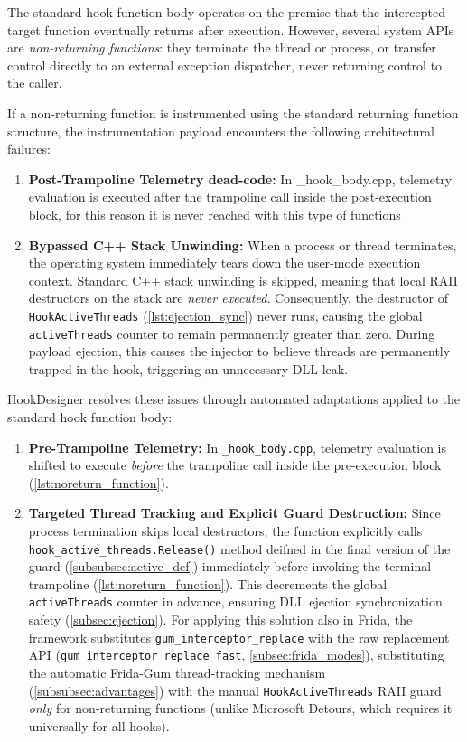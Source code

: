 The standard hook function body operates on the premise that the intercepted target function eventually returns after execution.
However, several system APIs are \emph{non-returning functions}:
they terminate the thread or process, or transfer control directly to an external exception dispatcher, never returning control to the caller.

If a non-returning function is instrumented using the standard returning function structure, the instrumentation payload encounters the following architectural failures:
\begin{enumerate}
	\item \textbf{Post-Trampoline Telemetry dead-code:} In \_hook\_body.cpp, telemetry evaluation is executed after the trampoline call inside the post-execution block, for this reason it is never reached with this type of functions
	\item \textbf{Bypassed C++ Stack Unwinding:} When a process or thread terminates, the operating system immediately tears down the user-mode execution context.
	Standard C++ stack unwinding is skipped, meaning that local RAII destructors on the stack are \emph{never executed}.
	Consequently, the destructor of \texttt{HookActiveThreads} (\cref{lst:ejection_sync}) never runs, causing the global \texttt{activeThreads} counter to remain permanently greater than zero.
	During payload ejection, this causes the injector to believe threads are permanently trapped in the hook, triggering an unnecessary DLL leak.
	
\end{enumerate}

HookDesigner resolves these issues through automated adaptations applied to the standard hook function body:

\begin{enumerate}
	\item \textbf{Pre-Trampoline Telemetry:} In \texttt{\_hook\_body.cpp}, telemetry evaluation is shifted to execute \emph{before} the trampoline call inside the pre-execution block (\cref{lst:noreturn_function}).
	\item \textbf{Targeted Thread Tracking and Explicit Guard Destruction:}  Since process termination skips local destructors, the function explicitly calls \texttt{hook\_active\_threads}\allowbreak\texttt{.Release()} method deifned in the final version of the guard (\cref{subsubsec:active_def}) immediately before invoking the terminal trampoline (\cref{lst:noreturn_function}).
	This decrements the global \texttt{activeThreads} counter in advance, ensuring DLL ejection synchronization safety (\cref{subsec:ejection}). For applying this solution also in Frida, the framework substitutes \texttt{gum\_interceptor\_}\allowbreak\texttt{replace} with the raw replacement API (\texttt{gum\_interceptor\_}\allowbreak\texttt{replace\_fast}, \cref{subsec:frida_modes}), substituting the automatic Frida-Gum thread-tracking mechanism (\cref{subsubsec:advantages}) with the manual \texttt{HookActiveThreads} RAII guard \emph{only} for non-returning functions (unlike Microsoft Detours, which requires it universally for all hooks).
	
\end{enumerate}


